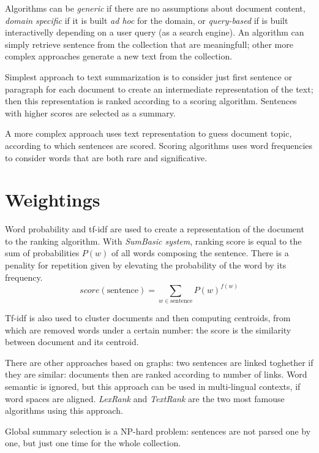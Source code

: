 \documentclass[11pt, a4page]{article}
\begin{document}
Algorithms can be \textit{generic} if there are no assumptions about document content, \textit{domain specific} if it is built \textit{ad hoc} for the domain, or \textit{query-based} if is built interactivelly depending on a user query (as a search engine).
An algorithm can simply retrieve sentence from the collection that are meaningfull; other more complex approaches generate a new text from the collection.

Simplest approach to text summarization is to consider just first sentence or paragraph for each document to create an intermediate representation of the text; then this representation is ranked according to a scoring algorithm.
Sentences with higher scores are selected as a summary.

A more complex approach uses text representation to guess document topic, according to which sentences are scored.
Scoring algorithms uses word frequencies to consider words that are both rare and significative.

\section{Weightings}
Word probability and tf-idf are used to create a representation of the document to the ranking algorithm.
With \textit{SumBasic system}, ranking score is equal to the sum of probabilities $P(w)$ of all words composing the sentence.
There is a penality for repetition given by elevating the probability of the word by its frequency.
\begin{equation*}
  score(\text{sentence}) = \sum_{w \in \text{sentence}} P(w)^{f(w)}
\end{equation*}

Tf-idf is also used to cluster documents and then computing centroids, from which are removed words under a certain number: the score is the similarity between document and its centroid.

There are other approaches based on graphs: two sentences are linked toghether if they are similar: documents then are ranked according to number of links.
Word semantic is ignored, but this approach can be used in multi-lingual contexts, if word spaces are aligned.
\textit{LexRank} and \textit{TextRank} are the two most famouse algorithms using this approach.

Global summary selection is a NP-hard problem: sentences are not parsed one by one, but just one time for the whole collection.
\end{document}
